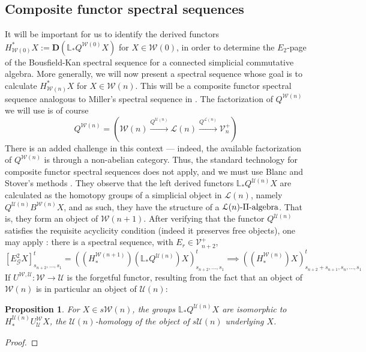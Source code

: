 \documentclass[11pt]{amsart} \renewcommand{\baselinestretch}{1.4}
\theoremstyle{plain}
\newtheorem{prop}[thm]{Proposition}
\theoremstyle{definition}
\renewcommand{\to}{\longrightarrow}
\newcommand{\scrG}{\mathscr{G}}
\newcommand{\calU}{\mathcal{U}}
\newcommand{\calL}{\mathcal{L}}
\newcommand{\calV}{\mathcal{V}}
\newcommand{\calw}{\mathcal{W}}
\newcommand{\citeBOX}[2][]{\cite[\mbox{#1}]{#2}}
\newcommand{\vect}[2]{\calV^{#1}_{#2}}
\newcommand{\BSW}{{\scrG}}
\newcommand{\E}[5]{[E^{#1}_{#2}#3]^{#4}_{#5}}
\newcommand{\dual}{\mathbf{D}}
\begin{document}
\begin{Composite functor spectral sequences}

\section{\textbf{Composite functor spectral sequences}}
\label{Composite functor spectral sequences}
It will be important for us to identify the derived functors $H^*_{\calw(0)}X:=\dual(\mathbb{L}_*Q^{\calw(0)}X)$ for $X\in\calw(0)$, in order to determine the  $E_2$-page of the Bousfield-Kan spectral sequence for a connected simplicial commutative algebra. More generally, we will now present a spectral sequence whose goal is to calculate $H^*_{\calw(n)}X$ for $X\in\calw(n)$. This will be a composite functor spectral sequence analogous to Miller's spectral sequence in \citeBOX[\S2]{MillerSullivanConjecture.pdf}. The factorization of $Q^{\calw(n)}$ we will use is of course 
\[Q^{\calw(n)}=\left(\calw(n)\overset{Q^{\calU(n)}}{\to}\calL(n)\overset{Q^{\calL(n)}}{\to}\vect{+}{n}\right)\]
There is an added challenge in this context --- indeed, the available factorization of $Q^{\calw(n)}$ is through a non-abelian category. Thus, the standard technology for composite functor spectral sequences does not apply, and we must use Blanc and Stover's methods \cite{Blanc_Stover-Groth_SS.pdf}. They observe that the left derived functors $\mathbb{L}_*Q^{\calU(n)}X$ are calculated as the homotopy groups of a simplicial object in $\calL(n)$, namely $Q^{\calU(n)}B^{\calw(n)}X$, and as such, they have the structure of a $\calL(n)\textup{-$\Pi$-algebra}$. That is, they form an object of $\calw(n+1)$.  After verifying that the functor $Q^{\calU(n)}$ satisfies the requisite acyclicity condition (indeed it preserves free objects), one may apply \cite[Theorem 4.4]{Blanc_Stover-Groth_SS.pdf}: there is a spectral sequence, with $E_r\in\vect{+}{n+2}$,
\[\E{2}{\BSW}{X}{t}{s_{n+2},\ldots,s_1}=((H_*^{\calw(n+1)})(\mathbb{L}_*Q^{\calU(n)})X)_{s_{n+2},\ldots,s_1}^t\implies ((H_*^{\calw(n)})X)_{s_{n+2}+s_{n+1},s_n,\ldots,s_1}^t\]
If $U^{\calw,\calU}:\calw\to\calU$ is the forgetful functor, resulting from the fact that an object of $\calw(n)$ is in particular an object of $\calU(n)$:
\begin{prop}
\label{what is LQU, dude?}
For $X\in s\calw(n)$, the groups $\mathbb{L}_*Q^{\calU(n)}X$ are isomorphic to $H_*^{\calU(n)}U^{\calw}_{\calU}X$, the $\calU(n)$-homology of the object of $s\calU(n)$ underlying $X$.
\end{prop}
\begin{proof}

\end{proof}
\end{Composite functor spectral sequences}
\end{document}
